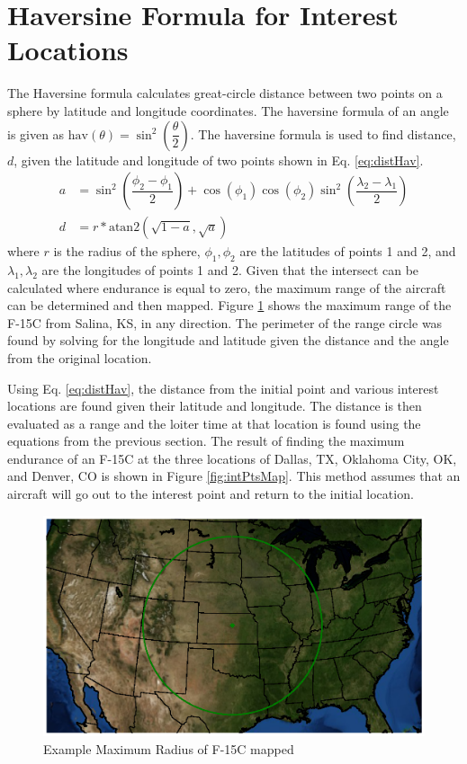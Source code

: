 \section{Haversine Formula for Interest Locations}
\label{section:havMethod}
The Haversine formula calculates great-circle distance between two points on a sphere by latitude and longitude coordinates. The haversine formula of an angle is given as $\text{hav}(\theta) = \sin^2\left(\dfrac{\theta}{2}\right)$. The haversine formula is used to find distance, $d$, given the latitude and longitude of two points shown in Eq. \ref{eq:distHav}. 
\begin{equation}
\begin{aligned}
    a &= \sin^2\left(\dfrac{\phi_2-\phi_1}{2}\right)+\cos(\phi_1)\cos(\phi_2)\sin^2\left(\dfrac{\lambda_2-\lambda_1}{2}\right)
    \label{eq:distHav}\\
    d &= r*\text{atan2}(\sqrt{1-a},\sqrt{a})
\end{aligned}
\end{equation}
where $r$ is the radius of the sphere, $\phi_1,\phi_2$ are the latitudes of points 1 and 2, and $\lambda_1,\lambda_2$ are the longitudes of points 1 and 2. Given that the intersect can be calculated where endurance is equal to zero, the maximum range of the aircraft can be determined and then mapped. Figure \ref{fig:maxRadius} shows the maximum range of the F-15C from Salina, KS, in any direction. The perimeter of the range circle was found by solving for the longitude and latitude given the distance and the angle from the original location. \par
Using Eq. \ref{eq:distHav}, the distance from the initial point and various interest locations are found given their latitude and longitude. The distance is then evaluated as a range and the loiter time at that location is found using the equations from the previous section. The result of finding the maximum endurance of an F-15C at the three locations of Dallas, TX, Oklahoma City, OK, and Denver, CO is shown in Figure \ref{fig:intPtsMap}. This method assumes that an aircraft will go out to the interest point and return to the initial location.
\begin{figure}
    \centering
    \includegraphics[width = \textwidth]{Thesis/Method/RadiusEx.eps}
    \caption{Example Maximum Radius of F-15C mapped}
    \label{fig:maxRadius}
\end{figure}
